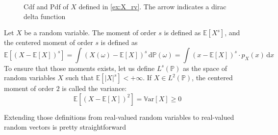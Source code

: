 \documentclass[a4paper,11pt]{article}
\newcommand{\Var}{\mathbb{V}\text{ar}}
\newcommand{\Ex}{\mathbb{E}}
\newcommand{\Prob}{\mathbb{P}}
\theoremstyle{defi}
\numberwithin{thmCounter}{section}
\begin{document}
\begin{figure}[!h]
  \centering
  
  \caption{Cdf and Pdf of $X$ defined in \cref{ex:X_rv}. The arrow indicates a dirac delta function}
  \label{fig:example_pdf_cdf}
\end{figure}

\begin{definition}
  Let $X$ be a random variable.
  The moment of order $s$ is defined as $\Ex\left[X^s\right]$, and the centered moment of order $s$ is defined as
  \begin{equation*}
    \Ex[(X-\Ex[X])^s]=\int \left(X(\omega) - \Ex[X]\right)^s \,\mathrm{d}\Prob(\omega) = \int (x-\Ex[X])^s\cdot p_X(x)\,\mathrm{d}x
  \end{equation*}
  To ensure that those moments exists, let us define $L^s(\Prob)$ as the space of random variables $X$ such that $\Ex\left[|X|^s\right] < +\infty$.
  If $X\in L^2(\Prob)$, the centered moment of order $2$ is called the variance:
  \begin{equation*}
    \label{eq:variance_def}
    \Ex\left[(X-\Ex[X])^2 \right] = \Var[X] \geq 0
  \end{equation*}
\end{definition}


Extending those definitions from real-valued random variables to real-valued random vectors is pretty straightforward
\end{document}
